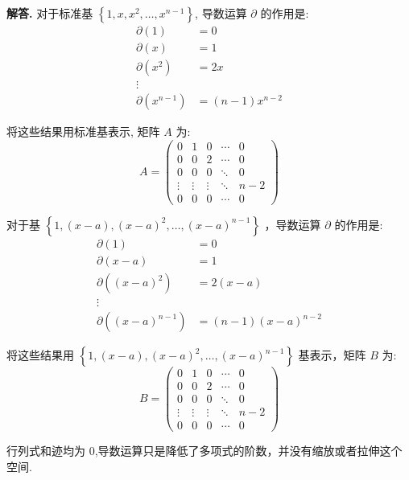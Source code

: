 \documentclass[12pt, a4paper, oneside]{ctexart}
\newenvironment{solution}{\par\noindent\textbf{解答. }}{\par}
\begin{document}
\begin{solution}
    对于标准基 $\left\{1, x, x^2, \ldots, x^{n-1}\right\}$, 导数运算 $\partial$ 的作用是:
    $$
    \begin{aligned}
    \partial(1) & =0 \\
    \partial(x) & =1 \\
    \partial\left(x^2\right) & =2 x \\
    \vdots & \\
    \partial\left(x^{n-1}\right) & =(n-1) x^{n-2}
    \end{aligned}
    $$

    将这些结果用标准基表示, 矩阵 $A$ 为:
    $$
    A=\begin{pmatrix}
    0 & 1 & 0 & \cdots & 0 \\
    0 & 0 & 2 & \cdots & 0 \\
    0 & 0 & 0 & \ddots & 0 \\
    \vdots & \vdots & \vdots & \ddots & n-2 \\
    0 & 0 & 0 & \cdots & 0
    \end{pmatrix}
    $$

    对于基 $\left\{1,(x-a),(x-a)^2, \ldots,(x-a)^{n-1}\right\}$ ，导数运算 $\partial$ 的作用是:
    $$
    \begin{aligned}
    \partial(1) & =0 \\
    \partial(x-a) & =1 \\
    \partial\left((x-a)^2\right) & =2(x-a) \\
    \vdots & \\
    \partial\left((x-a)^{n-1}\right) & =(n-1)(x-a)^{n-2}
    \end{aligned}
    $$

    将这些结果用 $\left\{1,(x-a),(x-a)^2, \ldots,(x-a)^{n-1}\right\}$ 基表示，矩阵 $B$ 为:
    $$
    B=\begin{pmatrix}
    0 & 1 & 0 & \cdots & 0 \\
    0 & 0 & 2 & \cdots & 0 \\
    0 & 0 & 0 & \ddots & 0 \\
    \vdots & \vdots & \vdots & \ddots & n-2 \\
    0 & 0 & 0 & \cdots & 0
    \end{pmatrix}
    $$

    行列式和迹均为 $0$,导数运算只是降低了多项式的阶数，并没有缩放或者拉伸这个空间.
\end{solution}
\end{document}
